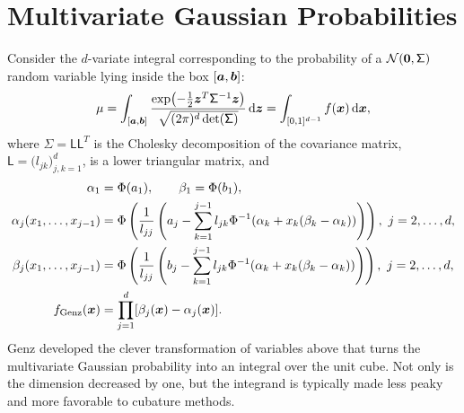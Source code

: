 \documentclass[graybox,footinfo]{svmult}
\begin{document}
\section{Multivariate Gaussian Probabilities} \label{FJH:sec:Gauss}
Consider the $d$-variate integral corresponding to the probability of a 
$\mathcal{N}({\boldsymbol{0}},\mathsf{\Sigma})$ random variable lying inside the box $[{\boldsymbol{a}},{\boldsymbol{b}}]$:
\begin{equation} \label{FJH:eq:MVN}
\mu = \int_{[\bsa,\bsb]} \frac{\exp\bigl(- \frac 12 \bsz^T \mathsf{\Sigma}^{-1} \bsz 
\bigr)}{\sqrt{(2 \pi)^d \det(\mathsf{\Sigma})}} \, \D \bsz = \int_{[0,1]^{d-1}} f(\bsx) \, \D 
\bsx,
\end{equation}
where $\mathsf{\Sigma} = \mathsf{L}\mathsf{L}^T$ is the Cholesky decomposition of 
the covariance matrix, $\mathsf{L} = \bigl(l_{jk}\bigr)_{j,k=1}^d$, is a lower triangular 
matrix, and
\begin{align}
\nonumber
\alpha_1 & = \Phi(a_1), \qquad \beta_1  = \Phi(b_1), \\
\nonumber
\alpha_j(x_1, \ldots, x_{j-1}) &= \Phi\left(\frac{1}{l_{jj}} \left(a_j - \sum_{k=1}^{j-1} 
l_{jk}\Phi^{-1}(\alpha_k + x_k(\beta_k-\alpha_k))\right)\right), \ j =2, \ldots, d,\\
\nonumber
\beta_j(x_1, \ldots, x_{j-1}) &= \Phi\left(\frac{1}{l_{jj}} \left(b_j - \sum_{k=1}^{j-1} 
l_{jk}\Phi^{-1}(\alpha_k + x_k(\beta_k-\alpha_k))\right)\right), \ j =2, \ldots, d, \\
f_{\textup{Genz}}(\bsx) &= \prod_{j=1}^{d} [\beta_j(\bsx) - \alpha_j(\bsx)]. 
\label{FJH:eq:Genz}
\end{align}
Genz \cite{Gen93} developed the clever transformation of variables above that turns the 
multivariate Gaussian probability into an integral over the unit cube.  Not only is the 
dimension decreased by one, but the integrand is typically made less peaky and more 
favorable to cubature methods.
\end{document}
